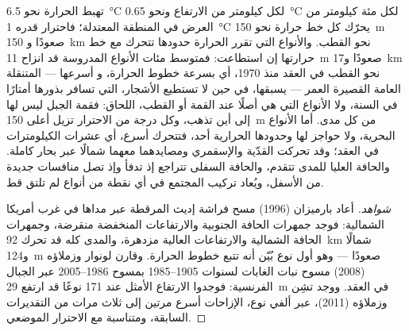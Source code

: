 \begin{proposition}\label{prop:b2:global-change:range}
تهبط الحرارة نحو \qty{6.5}{\celsius} لكل كيلومتر من
الارتفاع ونحو \qty{0.65}{\celsius} لكل مئة كيلومتر من
العرض في المنطقة المعتدلة؛ فاحترار قدره \qty{1}{\celsius}
يحرّك كل خط حرارة نحو \qty{150}{m} صعودًا و
\qty{150}{km} نحو القطب. والأنواع التي تقرر الحرارة حدودها
تتحرك مع خط حرارتها إن استطاعت: فمتوسط مئات
الأنواع المدروسة قد انزاح \qty{11}{m} صعودًا و\qty{17}{km}
نحو القطب في العقد منذ 1970، أي بسرعة خطوط الحرارة، و
أسرعها --- المتنقلة العامة القصيرة العمر --- يسبقها،
في حين لا تستطيع الأشجار، التي تسافر بذورها أمتارًا في السنة، ولا الأنواع التي
هي أصلًا عند القمة أو القطب، اللحاق: فقمة الجبل ليس
لها إلى أين تذهب، وكل درجة من الاحترار تزيل أعلى
\qty{150}{m} من كل مدى. أما الأنواع البحرية، ولا حواجز لها
وحدودها الحرارية أحد، فتتحرك أسرع، أي عشرات الكيلومترات في العقد؛
وقد تحركت القدّية والإسقمري ومصايدهما معهما شمالًا
عبر بحار كاملة. والحافة العليا للمدى تتقدم، والحافة
السفلى تتراجع إذ تدفأ وإذ تصل منافسات جديدة من
الأسفل، ويُعاد تركيب المجتمع في أي نقطة من أنواع
لم تلتق قط.
\end{proposition}
\begin{proof}[شواهد]
أعاد بارميزان (1996) مسح فراشة إديث المرقطة
عبر مداها في غرب أمريكا الشمالية: فوجد جمهرات الحافة
الجنوبية والارتفاعات المنخفضة منقرضة، وجمهرات الحافة الشمالية
والارتفاعات العالية مزدهرة، والمدى كله قد تحرك
\qty{92}{km} شمالًا و\qty{124}{m} صعودًا --- وهو أول نوع بُيّن
أنه تتبع خطوط الحرارة. وقارن لونوار وزملاؤه (2008)
مسوح نبات الغابات لسنوات 1905--1985 بمسوح 1986--2005 عبر
الجبال الفرنسية: فوجدوا الارتفاع الأمثل عند 171 نوعًا قد
ارتفع \qty{29}{m} في العقد. ووجد تشِن وزملاؤه (2011)، عبر
ألفي نوع، الإزاحات أسرع مرتين إلى ثلاث مرات
من التقديرات السابقة، ومتناسبة مع الاحترار الموضعي.
\end{proof}

